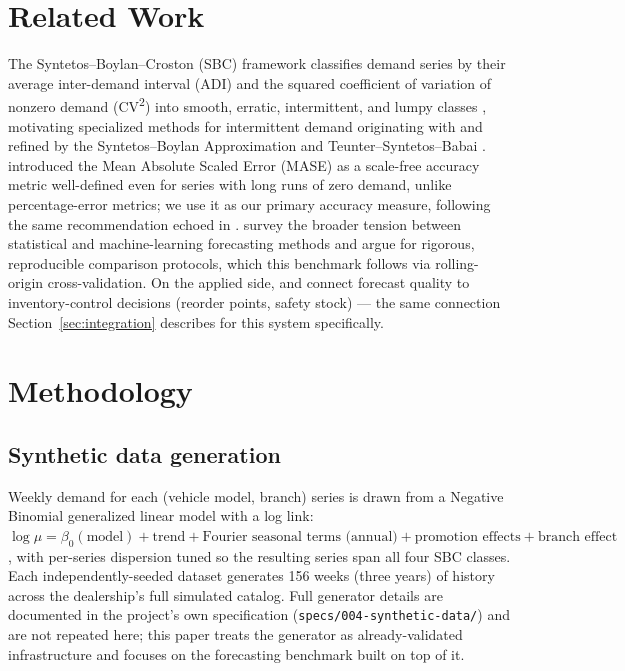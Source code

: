 \documentclass[11pt]{article}
\begin{document}
\section{Related Work}

The Syntetos--Boylan--Croston (SBC) framework classifies demand series by their average
inter-demand interval (ADI) and the squared coefficient of variation of nonzero demand
(CV\textsuperscript{2}) into smooth, erratic, intermittent, and lumpy classes
\citep{syntetos2005categorization}, motivating specialized methods for intermittent
demand originating with \citet{croston1972forecasting} and refined by the Syntetos--Boylan
Approximation \citep{syntetos2005accuracy} and Teunter--Syntetos--Babai
\citep{teunter2011intermittent}. \citet{hyndman2006another} introduced the Mean Absolute
Scaled Error (MASE) as a scale-free accuracy metric well-defined even for series with
long runs of zero demand, unlike percentage-error metrics; we use it as our primary
accuracy measure, following the same recommendation echoed in
\citet{hyndman2021forecasting}. \citet{makridakis2018statistical} survey the broader
tension between statistical and machine-learning forecasting methods and argue for
rigorous, reproducible comparison protocols, which this benchmark follows via
rolling-origin cross-validation. On the applied side, \citet{silver2016inventory} and
\citet{boylan2021intermittent} connect forecast quality to inventory-control decisions
(reorder points, safety stock) --- the same connection Section~\ref{sec:integration}
describes for this system specifically.

\section{Methodology}

\subsection{Synthetic data generation}

Weekly demand for each (vehicle model, branch) series is drawn from a Negative Binomial
generalized linear model with a log link: $\log \mu = \beta_0(\text{model}) + \text{trend}
+ \text{Fourier seasonal terms (annual)} + \text{promotion effects} + \text{branch
effect}$, with per-series dispersion tuned so the resulting series span all four SBC
classes. Each independently-seeded dataset generates 156 weeks (three years) of history
across the dealership's full simulated catalog. Full generator details are documented in
the project's own specification (\texttt{specs/004-synthetic-data/}) and are not repeated
here; this paper treats the generator as already-validated infrastructure and focuses on
the forecasting benchmark built on top of it.
\end{document}
